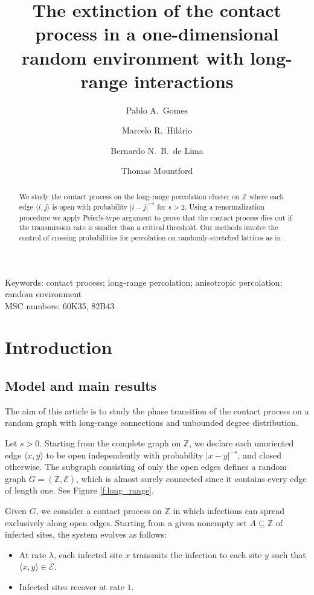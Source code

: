 \documentclass[a4paper,oneside,12pt]{amsart}
\title{The extinction of the contact process in a one-dimensional random environment with long-range interactions}
\author{Pablo A.\ Gomes}
\author{Marcelo R.\ Hilário}
\author{Bernardo N.\ B.\ de Lima}
\author{Thomas Mountford}
\theoremstyle{plain}
\theoremstyle{definition}
\theoremstyle{remark}
\begin{document}
\begin{abstract}
We study the contact process on the long-range percolation cluster on $\mathbb{Z}$ where each edge $\langle i,j \rangle$ is open with probability $|i-j|^{-s}$ for $s> 2$.
Using a renormalization procedure we apply Peierls-type argument to prove that the contact process dies out if the transmission rate is smaller than a critical threshold.
Our methods involve the control of crossing probabilities for percolation on randomly-stretched lattices as in \cite{Hilario2023}.
\end{abstract}

\maketitle


{\footnotesize Keywords: contact process; long-range percolation; anisotropic percolation; random environment \\
MSC numbers: 60K35, 82B43}


\section{Introduction}

\subsection{Model and main results}

The aim of this article is to study the phase transition of the contact process on a random graph with long-range connections and unbounded degree distribution.

Let \( s > 0 \).
Starting from the complete graph on \(\mathbb{Z}\), we declare each unoriented edge \(\langle x,y \rangle\) to be open independently with probability \( |x-y|^{-s} \), and closed otherwise.
The subgraph consisting of only the open edges defines a random graph \( G = (\mathbb{Z}, \mathcal{E}) \), which is almost surely connected since it contains every edge of length one.
See Figure \ref{f:long_range}.

Given \( G \), we consider a contact process on \(\mathbb{Z}\) in which infections can spread exclusively along open edges.  
Starting from a given nonempty set \( A \subseteq \mathbb{Z} \) of infected sites, the system evolves as follows:  
\begin{itemize}
    \item At rate \( \lambda \), each infected site \( x \) transmits the infection to each site \( y \) such that \( \langle x, y \rangle \in \mathcal{E} \).  
    \item Infected sites recover at rate \( 1 \).
\end{itemize}
\end{document}
